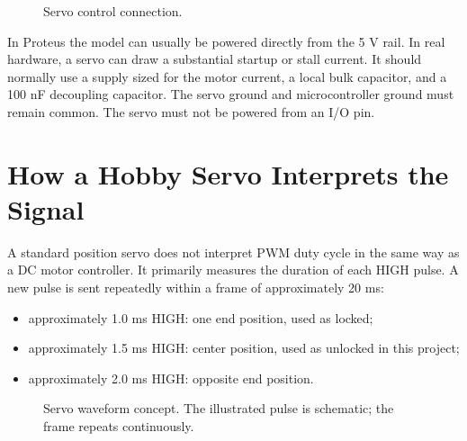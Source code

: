 \documentclass[11pt,a4paper]{article}
\begin{document}
\begin{figure}[H]
\centering
{}
\caption{Servo control connection.}
\end{figure}

In Proteus the model can usually be powered directly from the 5 V rail. In real hardware, a servo can draw a substantial startup or stall current. It should normally use a supply sized for the motor current, a local bulk capacitor, and a 100 nF decoupling capacitor. The servo ground and microcontroller ground must remain common. The servo must not be powered from an I/O pin.

\section{How a Hobby Servo Interprets the Signal}
A standard position servo does not interpret PWM duty cycle in the same way as a DC motor controller. It primarily measures the duration of each HIGH pulse. A new pulse is sent repeatedly within a frame of approximately 20 ms:
\begin{itemize}
  \item approximately 1.0 ms HIGH: one end position, used as locked;
  \item approximately 1.5 ms HIGH: center position, used as unlocked in this project;
  \item approximately 2.0 ms HIGH: opposite end position.
\end{itemize}

\begin{figure}[H]
\centering
{}
\caption{Servo waveform concept. The illustrated pulse is schematic; the frame repeats continuously.}
\end{figure}
\end{document}
